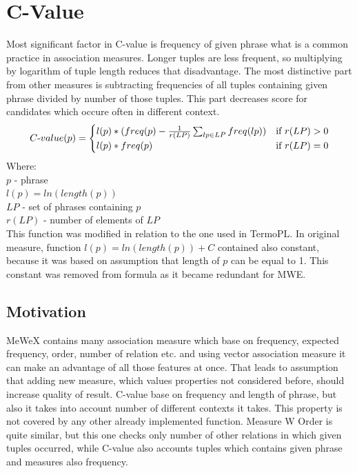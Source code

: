 \section{C-Value}
Most significant factor in C-value is frequency of given phrase what is a common practice in association measures. 
Longer tuples are less frequent, so multiplying by logarithm of tuple length reduces that disadvantage. 
The most distinctive part from other measures is subtracting frequencies of all tuples containing given phrase divided by number of those tuples. 
This part decreases score for candidates which occure often in different context.
\clearpage
\[ 
    C{\text -}value(p) = \begin{cases}
        l(p) * (freq(p) - \frac{1}{r(LP)}\sum_{lp \in LP}{freq(lp)}) & \text{if } r(LP) > 0\\
        l(p) * freq(p)            & \text{if } r(LP) = 0\\
    \end{cases}
\]
Where: \\
\(p\)  - phrase \\
\(l(p) = ln(length(p))\) \\
\(LP\)  - set of phrases containing \(p\) \\
\(r(LP)\) - number of elements of \(LP\) \\

This function was modified in relation to the one used in TermoPL. In original measure, function \(l(p) = ln(length(p)) + C\) 
contained also constant, because it was based on assumption that length of \(p\) can be equal to 1. This constant was removed 
from formula as it became redundant for MWE.

\subsection{Motivation}
MeWeX contains many association measure which base on frequency, expected frequency, order, number of relation etc. 
and using vector association measure it can make an advantage of all those features at once. That leads to assumption that adding new measure, 
which values properties not considered before, should increase quality of result. C-value base on frequency and length of phrase, 
but also it takes into account number of different contexts it takes. This property is not covered by any other already implemented function.
Measure W Order is quite similar, but this one checks only number of other relations in which given tuples occurred, 
while C-value also accounts tuples which contains given phrase and measures also frequency.

